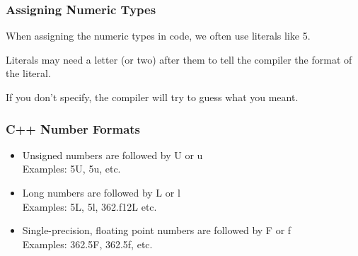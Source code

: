 
\begin{frame}
\frametitle{Assigning Numeric Types}

When assigning the numeric types in code, we often use literals like 5.

Literals may need a letter (or two) after them to tell the compiler the format of the literal.

If you don't specify, the compiler will try to guess what you meant.

\end{frame}

\begin{frame}
\frametitle{C++ Number Formats}

\begin{itemize}
	\item Unsigned numbers are followed by U or u\\ \quad
Examples: 5U, 5u, etc.
	\item Long numbers are followed by L or l\\ \quad
Examples: 5L, 5l, 362.f12L etc.
	\item Single-precision, floating point numbers are followed by F or f\\ \quad
Examples: 362.5F, 362.5f, etc.
\end{itemize}

\end{frame}


